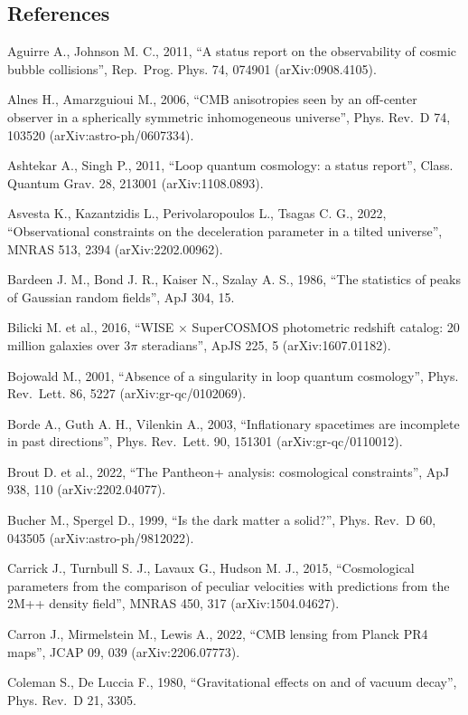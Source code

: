 \documentclass[
]{article}
\begin{document}
\hypertarget{references}{%
\subsection{\texorpdfstring{\textbf{References}}{References}}\label{references}}

Aguirre A., Johnson M. C., 2011, ``A status report on the observability
of cosmic bubble collisions'', Rep.~Prog. Phys. 74, 074901
(arXiv:0908.4105).

Alnes H., Amarzguioui M., 2006, ``CMB anisotropies seen by an off-center
observer in a spherically symmetric inhomogeneous universe'', Phys.
Rev.~D 74, 103520 (arXiv:astro-ph/0607334).

Ashtekar A., Singh P., 2011, ``Loop quantum cosmology: a status
report'', Class. Quantum Grav. 28, 213001 (arXiv:1108.0893).

Asvesta K., Kazantzidis L., Perivolaropoulos L., Tsagas C. G., 2022,
``Observational constraints on the deceleration parameter in a tilted
universe'', MNRAS 513, 2394 (arXiv:2202.00962).

Bardeen J. M., Bond J. R., Kaiser N., Szalay A. S., 1986, ``The
statistics of peaks of Gaussian random fields'', ApJ 304, 15.

Bilicki M. et al., 2016, ``WISE × SuperCOSMOS photometric redshift
catalog: 20 million galaxies over \(3\pi\) steradians'', ApJS 225, 5
(arXiv:1607.01182).

Bojowald M., 2001, ``Absence of a singularity in loop quantum
cosmology'', Phys. Rev.~Lett. 86, 5227 (arXiv:gr-qc/0102069).

Borde A., Guth A. H., Vilenkin A., 2003, ``Inflationary spacetimes are
incomplete in past directions'', Phys. Rev.~Lett. 90, 151301
(arXiv:gr-qc/0110012).

Brout D. et al., 2022, ``The Pantheon+ analysis: cosmological
constraints'', ApJ 938, 110 (arXiv:2202.04077).

Bucher M., Spergel D., 1999, ``Is the dark matter a solid?'', Phys.
Rev.~D 60, 043505 (arXiv:astro-ph/9812022).

Carrick J., Turnbull S. J., Lavaux G., Hudson M. J., 2015,
``Cosmological parameters from the comparison of peculiar velocities
with predictions from the 2M++ density field'', MNRAS 450, 317
(arXiv:1504.04627).

Carron J., Mirmelstein M., Lewis A., 2022, ``CMB lensing from Planck PR4
maps'', JCAP 09, 039 (arXiv:2206.07773).

Coleman S., De Luccia F., 1980, ``Gravitational effects on and of vacuum
decay'', Phys. Rev.~D 21, 3305.
\end{document}
